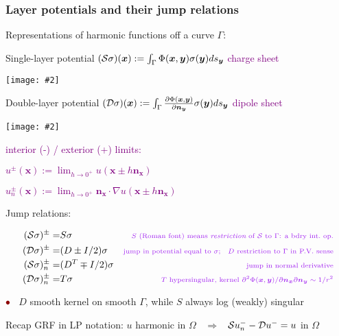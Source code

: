 \documentclass[t]{beamer}
\newcommand{\ft}[1]{\frametitle{#1}}
\newcommand{\bea}{\begin{eqnarray}}
\newcommand{\eea}{\end{eqnarray}}
\newcommand{\mbf}[1]{{\bm #1}}           %
\newcommand{\com}[1]{{\scriptsize \textcolor{purple}{#1}}}      %
\newcommand{\sg}{\vspace{1ex}}
\newcommand{\rb}{\ensuremath{\textcolor{darkred}{\bullet\;}}\ }
\newcommand{\bmp}[1]{\begin{minipage}{#1}}
\newcommand{\emp}{\end{minipage}}
\newcommand{\pig}[2]{\bmp{#1}\texttt{[image: \#2]}\emp} %
\newcommand{\xx}{\mbf{x}}
\newcommand{\yy}{\mbf{y}}
\newcommand{\nn}{\mbf{n}}
\newcommand{\Srep}{{\cal S}}
\newcommand{\Drep}{{\cal D}}
\begin{document}
\begin{noframe}\ft{Layer potentials and their jump relations}


  \bmp{4in}
  Representations of harmonic functions off a curve $\Gamma$:
\;\com{``density'' $\sigma$}
  
  \sg

  Single-layer potential
  $(\Srep\sigma)(\xx) := \int_\Gamma \Phi(\xx,\yy) \sigma(\yy) ds_\yy$
  \;
    \com{charge sheet}
  \emp
\hfill \pig{.6in}{slp_lap}

  \bmp{4in}
  Double-layer potential
$(\Drep\sigma)(\xx) := \int_\Gamma \frac{\partial \Phi(\xx,\yy)}{\partial \nn_\yy}
  \sigma(\yy) ds_\yy$
  \com{dipole sheet}

  \vspace{4ex}

  \mbox{}
  \emp
\hfill \pig{.6in}{dlp_lap}

\vspace{-4ex}

\bmp{1.9in}
\com{interior (-) / exterior (+) limits:}
\emp
\bmp{2.5in}
\com{
  $u^{\pm}(\xx) := \lim_{h\to 0^+} u(\xx \pm h\nn_\xx)$    \quad 
}

\com{
  $u_n^{\pm}(\xx) := \lim_{h\to 0^+} \nn_\xx \cdot \nabla u(\xx \pm h\nn_\xx)$
 }
\emp

{\large Jump relations:}

\vspace{-5ex}

\bea
(\Srep\sigma)^\pm =&  S\sigma
 & \mbox{\com{$S$ (Roman font) means {\em restriction} of $\Srep$ to $\Gamma$: a bdry int.\ op.}}
\nonumber\\
(\Drep\sigma)^\pm =&  (D\pm I/2) \sigma
& \mbox{\com{jump in potential equal to $\sigma$; \; $D$ restriction to $\Gamma$ in P.V. sense}}
\nonumber \\
(\Srep\sigma)_n^\pm =&  (D^T\mp I/2) \sigma
& \mbox{\com{jump in normal derivative}} %
\nonumber \\
(\Drep\sigma)_n^\pm =&  T \sigma
& \mbox{\com{$T$ hypersingular, kernel $\partial^2 \Phi(\xx,\yy) / \partial \nn_\xx \partial \nn_\yy \sim 1/r^2$}}
\nonumber
\eea

\vspace{-1ex}

\rb $D$ smooth kernel on smooth $\Gamma$, while $S$ always log (weakly) singular



\sg

Recap GRF in LP notation:
\hfill $u$ harmonic in $\Omega$
$\;\;\Rightarrow\;\;$
$\Srep u_n^- - \Drep u^- = u$ in $\Omega$




\end{noframe}
\end{document}
